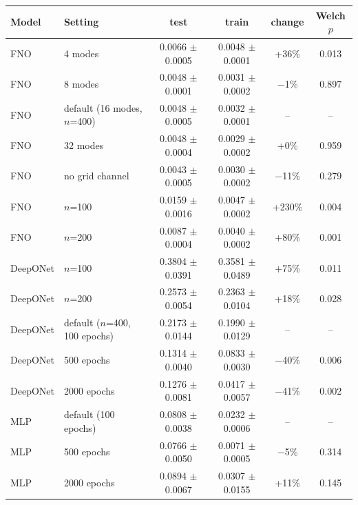 \begin{tabular}{llcccc}
\toprule
Model & Setting & test & train & change & Welch $p$ \\
\midrule
FNO & 4 modes & 0.0066 $\pm$ 0.0005 & 0.0048 $\pm$ 0.0001 & +36\% & 0.013 \\
FNO & 8 modes & 0.0048 $\pm$ 0.0001 & 0.0031 $\pm$ 0.0002 & $-$1\% & 0.897 \\
FNO & default (16 modes, $n$=400) & 0.0048 $\pm$ 0.0005 & 0.0032 $\pm$ 0.0001 & -- & -- \\
FNO & 32 modes & 0.0048 $\pm$ 0.0004 & 0.0029 $\pm$ 0.0002 & +0\% & 0.959 \\
FNO & no grid channel & 0.0043 $\pm$ 0.0005 & 0.0030 $\pm$ 0.0002 & $-$11\% & 0.279 \\
FNO & $n$=100 & 0.0159 $\pm$ 0.0016 & 0.0047 $\pm$ 0.0002 & +230\% & 0.004 \\
FNO & $n$=200 & 0.0087 $\pm$ 0.0004 & 0.0040 $\pm$ 0.0002 & +80\% & 0.001 \\
\midrule
DeepONet & $n$=100 & 0.3804 $\pm$ 0.0391 & 0.3581 $\pm$ 0.0489 & +75\% & 0.011 \\
DeepONet & $n$=200 & 0.2573 $\pm$ 0.0054 & 0.2363 $\pm$ 0.0104 & +18\% & 0.028 \\
DeepONet & default ($n$=400, 100 epochs) & 0.2173 $\pm$ 0.0144 & 0.1990 $\pm$ 0.0129 & -- & -- \\
DeepONet & 500 epochs & 0.1314 $\pm$ 0.0040 & 0.0833 $\pm$ 0.0030 & $-$40\% & 0.006 \\
DeepONet & 2000 epochs & 0.1276 $\pm$ 0.0081 & 0.0417 $\pm$ 0.0057 & $-$41\% & 0.002 \\
\midrule
MLP & default (100 epochs) & 0.0808 $\pm$ 0.0038 & 0.0232 $\pm$ 0.0006 & -- & -- \\
MLP & 500 epochs & 0.0766 $\pm$ 0.0050 & 0.0071 $\pm$ 0.0005 & $-$5\% & 0.314 \\
MLP & 2000 epochs & 0.0894 $\pm$ 0.0067 & 0.0307 $\pm$ 0.0155 & +11\% & 0.145 \\
\bottomrule
\end{tabular}
